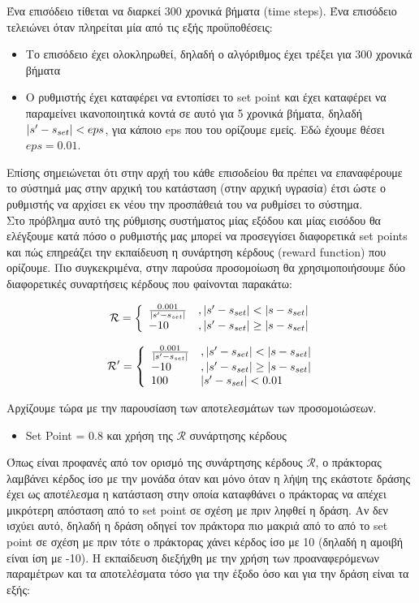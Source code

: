 \documentclass[11pt]{article} %
\numberwithin{equation}{subsection}
\begin{document}
Ένα επισόδειο τίθεται να διαρκεί 300 χρονικά βήματα (time steps). Ένα επισόδειο τελειώνει όταν πληρείται μία από τις εξής προϋποθέσεις:
\begin{itemize}
  \item Το επισόδειο έχει ολοκληρωθεί, δηλαδή ο αλγόριθμος έχει τρέξει για 300 χρονικά βήματα
  \item Ο ρυθμιστής έχει καταφέρει να εντοπίσει το set point και έχει καταφέρει να παραμείνει ικανοποιητικά κοντά σε αυτό για 5 χρονικά βήματα, δηλαδή $\abs{s' - s_{set}} < eps$, για κάποιο eps που του ορίζουμε εμείς. Εδώ έχουμε θέσει $eps = 0.01$.
\end{itemize}

Επίσης σημειώνεται ότι στην αρχή του κάθε επισοδείου θα πρέπει να επαναφέρουμε το σύστημά μας στην αρχική του κατάσταση (στην αρχική υγρασία) έτσι ώστε ο ρυθμιστής να αρχίσει εκ νέου την προσπάθειά του να ρυθμίσει το σύστημα.\\

Στο πρόβλημα αυτό της ρύθμισης συστήματος μίας εξόδου και μίας εισόδου θα ελέγξουμε κατά πόσο ο ρυθμιστής μας μπορεί να προσεγγίσει διαφορετικά set points και πώς επηρεάζει την εκπαίδευση η συνάρτηση κέρδους (reward function) που ορίζουμε. Πιο συγκεκριμένα, στην παρούσα προσομοίωση θα χρησιμοποιήσουμε δύο διαφορετικές συναρτήσεις κέρδους που φαίνονται παρακάτω:

\[ 
\ \mathcal{R} = \left\{
\begin{array}{ll}
      \frac{0.001}{\abs{s' - s_{set}}} & , \abs{s' - s_{set}} < \abs{s - s_{set}} \\
      -10 & , \abs{s'- s_{set}} \geq \abs{s - s_{set}} \\
\end{array} 
\right. 
\]

\[ 
\ \mathcal{R}' = \left\{
\begin{array}{ll}
      \frac{0.001}{\abs{s' - s_{set}}} & , \abs{s' - s_{set}} < \abs{s - s_{set}} \\
      -10 & , \abs{s'- s_{set}} \geq \abs{s - s_{set}} \\
	100 & \abs{s' - s_{set}} < 0.01
\end{array} 
\right. 
\]

Αρχίζουμε τώρα με την παρουσίαση των αποτελεσμάτων των προσομοιώσεων.\\

\begin{itemize}
 \item Set Point = 0.8 και χρήση της $\mathcal{R}$ συνάρτησης κέρδους
\end{itemize}
Όπως είναι προφανές από τον ορισμό της συνάρτησης κέρδους $\mathcal{R}$, ο πράκτορας λαμβάνει κέρδος ίσο με την μονάδα όταν και μόνο όταν η λήψη της εκάστοτε δράσης έχει ως αποτέλεσμα η κατάσταση στην οποία καταφθάνει ο πράκτορας να απέχει μικρότερη απόσταση από το set point σε σχέση με πριν ληφθεί η δράση. Αν δεν ισχύει αυτό, δηλαδή η δράση οδηγεί τον πράκτορα πιο μακριά από το από το set point σε σχέση με πριν τότε ο πράκτορας χάνει κέρδος ίσο με 10 (δηλαδή η αμοιβή είναι ίση με -10). Η εκπαίδευση διεξήχθη με την χρήση των προαναφερόμενων παραμέτρων και τα αποτελέσματα τόσο για την έξοδο όσο και για την δράση είναι τα εξής:
\end{document}
